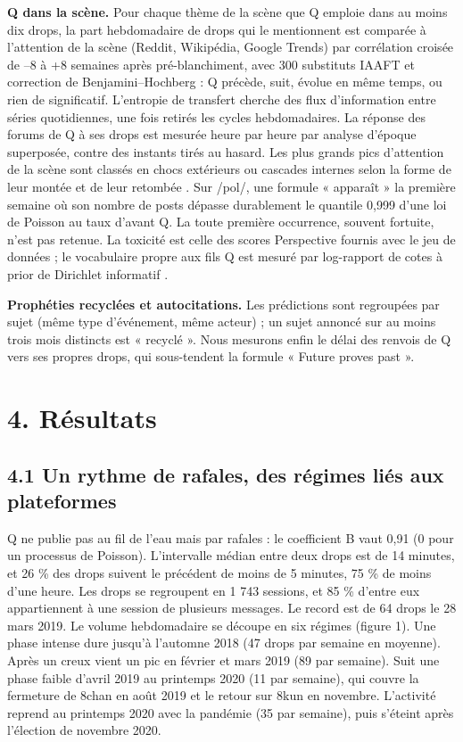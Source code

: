 \documentclass[11pt,a4paper]{article}
\begin{document}
\textbf{Q dans la scène.} Pour chaque thème de la scène que Q emploie dans au moins dix drops, la part hebdomadaire de drops qui le mentionnent est comparée à l'attention de la scène (Reddit, Wikipédia, Google Trends) par corrélation croisée de –8 à +8 semaines après pré-blanchiment, avec 300 substituts IAAFT \parencite{schreiber2000surrogate} et correction de Benjamini–Hochberg \parencite{benjamini1995controlling} : Q précède, suit, évolue en même temps, ou rien de significatif. L'entropie de transfert \parencite{schreiber2000measuring} cherche des flux d'information entre séries quotidiennes, une fois retirés les cycles hebdomadaires. La réponse des forums de Q à ses drops est mesurée heure par heure par analyse d'époque superposée, contre des instants tirés au hasard. Les plus grands pics d'attention de la scène sont classés en chocs extérieurs ou cascades internes selon la forme de leur montée et de leur retombée \parencite{crane2008robust}. Sur /pol/, une formule « apparaît » la première semaine où son nombre de posts dépasse durablement le quantile 0,999 d'une loi de Poisson au taux d'avant Q. La toute première occurrence, souvent fortuite, n'est pas retenue. La toxicité est celle des scores Perspective fournis avec le jeu de données ; le vocabulaire propre aux fils Q est mesuré par log-rapport de cotes à prior de Dirichlet informatif \parencite{monroe2008fightin}.

\textbf{Prophéties recyclées et autocitations.} Les prédictions sont regroupées par sujet (même type d'événement, même acteur) ; un sujet annoncé sur au moins trois mois distincts est « recyclé ». Nous mesurons enfin le délai des renvois de Q vers ses propres drops, qui sous-tendent la formule « Future proves past ».

\section*{4. Résultats}

\subsection*{4.1 Un rythme de rafales, des régimes liés aux plateformes}

Q ne publie pas au fil de l'eau mais par rafales : le coefficient B vaut 0,91 (0 pour un processus de Poisson). L'intervalle médian entre deux drops est de 14 minutes, et 26 \% des drops suivent le précédent de moins de 5 minutes, 75 \% de moins d'une heure. Les drops se regroupent en 1 743 sessions, et 85 \% d'entre eux appartiennent à une session de plusieurs messages. Le record est de 64 drops le 28 mars 2019. Le volume hebdomadaire se découpe en six régimes (figure 1). Une phase intense dure jusqu'à l'automne 2018 (47 drops par semaine en moyenne). Après un creux vient un pic en février et mars 2019 (89 par semaine). Suit une phase faible d'avril 2019 au printemps 2020 (11 par semaine), qui couvre la fermeture de 8chan en août 2019 et le retour sur 8kun en novembre. L'activité reprend au printemps 2020 avec la pandémie (35 par semaine), puis s'éteint après l'élection de novembre 2020.
\end{document}
